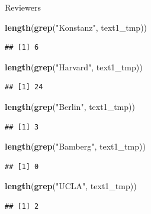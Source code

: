 \documentclass[ignorenonframetext,]{beamer}
\newenvironment{Shaded}{\begin{snugshade}}{\end{snugshade}}
\newcommand{\KeywordTok}[1]{\textcolor[rgb]{0.13,0.29,0.53}{\textbf{{#1}}}}
\newcommand{\StringTok}[1]{\textcolor[rgb]{0.31,0.60,0.02}{{#1}}}
\newcommand{\NormalTok}[1]{{#1}}
\begin{document}
\begin{frame}[fragile]{Reviewers}

\begin{Shaded}
\begin{Highlighting}[]
\KeywordTok{length}\NormalTok{(}\KeywordTok{grep}\NormalTok{(}\StringTok{"Konstanz"}\NormalTok{, text1_tmp))}
\end{Highlighting}
\end{Shaded}

\begin{verbatim}
## [1] 6
\end{verbatim}

\begin{Shaded}
\begin{Highlighting}[]
\KeywordTok{length}\NormalTok{(}\KeywordTok{grep}\NormalTok{(}\StringTok{"Harvard"}\NormalTok{, text1_tmp))}
\end{Highlighting}
\end{Shaded}

\begin{verbatim}
## [1] 24
\end{verbatim}

\begin{Shaded}
\begin{Highlighting}[]
\KeywordTok{length}\NormalTok{(}\KeywordTok{grep}\NormalTok{(}\StringTok{"Berlin"}\NormalTok{, text1_tmp))}
\end{Highlighting}
\end{Shaded}

\begin{verbatim}
## [1] 3
\end{verbatim}

\begin{Shaded}
\begin{Highlighting}[]
\KeywordTok{length}\NormalTok{(}\KeywordTok{grep}\NormalTok{(}\StringTok{"Bamberg"}\NormalTok{, text1_tmp))}
\end{Highlighting}
\end{Shaded}

\begin{verbatim}
## [1] 0
\end{verbatim}

\begin{Shaded}
\begin{Highlighting}[]
\KeywordTok{length}\NormalTok{(}\KeywordTok{grep}\NormalTok{(}\StringTok{"UCLA"}\NormalTok{, text1_tmp))}
\end{Highlighting}
\end{Shaded}

\begin{verbatim}
## [1] 2
\end{verbatim}

\end{frame}
\end{document}

